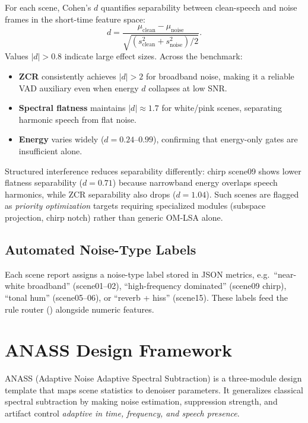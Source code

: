 For each scene, Cohen's $d$ quantifies separability between clean-speech and noise frames in the short-time feature space:
\begin{equation}
  d = \frac{\mu_{\mathrm{clean}} - \mu_{\mathrm{noise}}}
         {\sqrt{(s_{\mathrm{clean}}^2 + s_{\mathrm{noise}}^2)/2}}.
\end{equation}
Values $|d| > 0.8$ indicate large effect sizes. Across the benchmark:

\begin{itemize}
  \item \textbf{ZCR} consistently achieves $|d| > 2$ for broadband noise, making it a reliable VAD auxiliary even when energy $d$ collapses at low SNR.
  \item \textbf{Spectral flatness} maintains $|d| \approx 1.7$ for white/pink scenes, separating harmonic speech from flat noise.
  \item \textbf{Energy} varies widely ($d=0.24$--$0.99$), confirming that energy-only gates are insufficient alone.
\end{itemize}

Structured interference reduces separability differently: chirp scene09 shows lower flatness separability ($d=0.71$) because narrowband energy overlaps speech harmonics, while ZCR separability also drops ($d=1.04$). Such scenes are flagged as \emph{priority optimization} targets requiring specialized modules (subspace projection, chirp notch) rather than generic OM-LSA alone.

\subsection{Automated Noise-Type Labels}

Each scene report assigns a noise-type label stored in JSON metrics, e.g.\
``near-white broadband'' (scene01--02), ``high-frequency dominated'' (scene09 chirp), ``tonal hum'' (scene05--06), or ``reverb + hiss'' (scene15). These labels feed the rule router () alongside numeric features.

\section{ANASS Design Framework}
\label{sec:anass}

ANASS (Adaptive Noise Adaptive Spectral Subtraction) is a three-module design template that maps scene statistics to denoiser parameters. It generalizes classical spectral subtraction by making noise estimation, suppression strength, and artifact control \emph{adaptive in time, frequency, and speech presence}.

